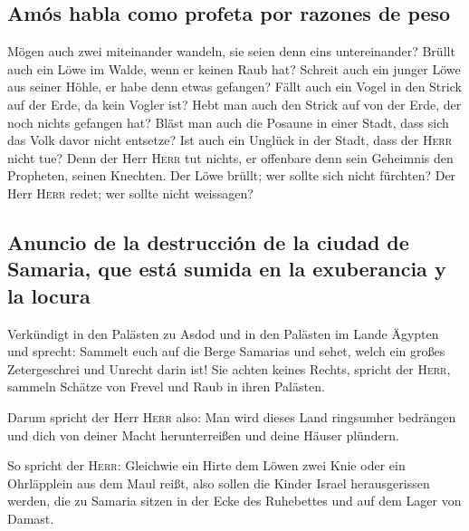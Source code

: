 \hypertarget{amuxf3s-habla-como-profeta-por-razones-de-peso}{%
\subsection{Amós habla como profeta por razones de
peso}\label{amuxf3s-habla-como-profeta-por-razones-de-peso}}

 Mögen auch zwei miteinander wandeln, sie seien denn eins
untereinander?  Brüllt auch ein Löwe im Walde, wenn er
keinen Raub hat? Schreit auch ein junger Löwe aus seiner Höhle, er habe
denn etwas gefangen?  Fällt auch ein Vogel in den Strick
auf der Erde, da kein Vogler ist? Hebt man auch den Strick auf von der
Erde, der noch nichts gefangen hat?  Bläst man auch die
Posaune in einer Stadt, dass sich das Volk davor nicht entsetze? Ist
auch ein Unglück in der Stadt, dass der \textsc{Herr} nicht tue?
 Denn der Herr \textsc{Herr} tut nichts, er offenbare denn
sein Geheimnis den Propheten, seinen Knechten.  Der Löwe
brüllt; wer sollte sich nicht fürchten? Der Herr \textsc{Herr} redet;
wer sollte nicht weissagen?

\hypertarget{anuncio-de-la-destrucciuxf3n-de-la-ciudad-de-samaria-que-estuxe1-sumida-en-la-exuberancia-y-la-locura}{%
\subsection{Anuncio de la destrucción de la ciudad de Samaria, que está
sumida en la exuberancia y la
locura}\label{anuncio-de-la-destrucciuxf3n-de-la-ciudad-de-samaria-que-estuxe1-sumida-en-la-exuberancia-y-la-locura}}

 Verkündigt in den Palästen zu Asdod und in den Palästen
im Lande Ägypten und sprecht: Sammelt euch auf die Berge Samarias und
sehet, welch ein großes Zetergeschrei und Unrecht darin ist!
 Sie achten keines Rechts, spricht der \textsc{Herr},
sammeln Schätze von Frevel und Raub in ihren Palästen.

 Darum spricht der Herr \textsc{Herr} also: Man wird
dieses Land ringsumher bedrängen und dich von deiner Macht
herunterreißen und deine Häuser plündern.

 So spricht der \textsc{Herr}: Gleichwie ein Hirte dem
Löwen zwei Knie oder ein Ohrläpplein aus dem Maul reißt, also sollen die
Kinder Israel herausgerissen werden, die zu Samaria sitzen in der Ecke
des Ruhebettes und auf dem Lager von Damast.

